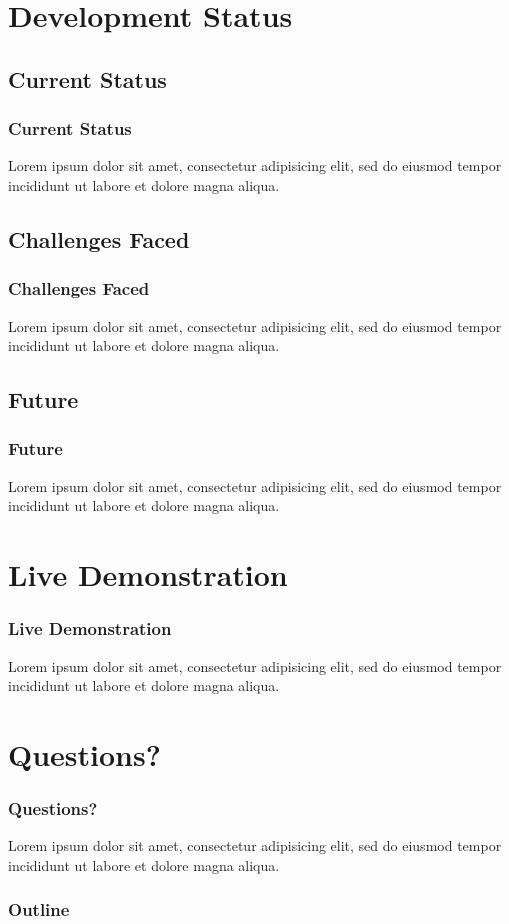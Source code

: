 \documentclass{beamer}
\begin{document}
\section{Development Status}

\subsection{Current Status}
\begin{frame}
\frametitle{Current Status}
Lorem ipsum dolor sit amet, consectetur adipisicing elit, sed do eiusmod tempor incididunt ut labore et dolore magna aliqua.
\end{frame}

\subsection{Challenges Faced}
\begin{frame}
\frametitle{Challenges Faced}
Lorem ipsum dolor sit amet, consectetur adipisicing elit, sed do eiusmod tempor incididunt ut labore et dolore magna aliqua.
\end{frame}

\subsection{Future}
\begin{frame}
\frametitle{Future}
Lorem ipsum dolor sit amet, consectetur adipisicing elit, sed do eiusmod tempor incididunt ut labore et dolore magna aliqua.
\end{frame}

\section{Live Demonstration}

\begin{frame}
\frametitle{Live Demonstration}
Lorem ipsum dolor sit amet, consectetur adipisicing elit, sed do eiusmod tempor incididunt ut labore et dolore magna aliqua.
\end{frame}

\section{Questions?}

\begin{frame}
\frametitle{Questions?}
Lorem ipsum dolor sit amet, consectetur adipisicing elit, sed do eiusmod tempor incididunt ut labore et dolore magna aliqua.
\end{frame}








\begin{frame}
\frametitle{Outline}
\tableofcontents
\end{frame}
\end{document}
